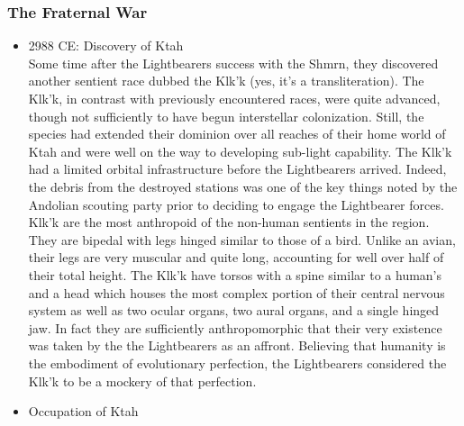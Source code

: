 \subsubsection{The Fraternal War}
\label{FraternalWar}
\begin{itemize}

\item 2988 CE: Discovery of Ktah \\

Some time after the Lightbearers success with the Shmrn, they
discovered another sentient race dubbed the Klk'k (yes, it's a
transliteration).  The Klk'k, in contrast with previously encountered
races, were quite advanced, though not sufficiently to have begun
interstellar colonization.  Still, the species had extended their
dominion over all reaches of their home world of Ktah and were well on
the way to developing sub-light capability. The Klk'k had a limited
orbital infrastructure before the Lightbearers arrived. Indeed, the
debris from the destroyed stations was one of the key things noted by
the Andolian scouting party prior to deciding to engage the
Lightbearer forces.  Klk'k are the most anthropoid of the non-human
sentients in the region.  They are bipedal with legs hinged similar to
those of a bird.  Unlike an avian, their legs are very muscular and
quite long, accounting for well over half of their total height.  The
Klk'k have torsos with a spine similar to a human's and a head which
houses the most complex portion of their central nervous system as
well as two ocular organs, two aural organs, and a single hinged jaw.
In fact they are sufficiently anthropomorphic that their very
existence was taken by the the Lightbearers as an affront.  Believing
that humanity is the embodiment of evolutionary perfection, the
Lightbearers considered the Klk'k to be a mockery of that perfection.

\item Occupation of Ktah \\


\end{itemize}
